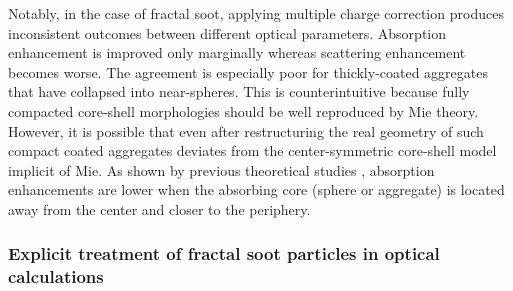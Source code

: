 Notably, in the case of fractal soot, applying multiple charge correction produces inconsistent outcomes between different optical parameters. Absorption enhancement is improved only marginally whereas scattering enhancement becomes worse. The agreement is especially poor for thickly-coated aggregates that have collapsed into near-spheres. This is counterintuitive because fully compacted core-shell morphologies should be well reproduced by Mie theory. However, it is possible that even after restructuring the real geometry of such compact coated aggregates deviates from the center-symmetric core-shell model implicit of Mie. As shown by previous theoretical studies \citep{RN71,RN72}, absorption enhancements are lower when the absorbing core (sphere or aggregate) is located away from the center and closer to the periphery.

\subsubsection{Explicit treatment of fractal soot particles in optical calculations}



